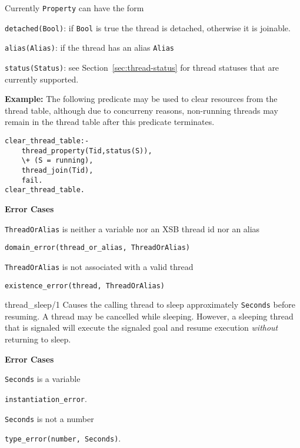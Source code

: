 \begin{description}
Currently {\tt Property} can have the form 
\bi
\item {\tt detached(Bool)}: if {\tt Bool} is true the thread is
  detached, otherwise it is joinable.
%
\item {\tt alias(Alias)}: if the thread has an alias {\tt Alias}
%
\item {\tt status(Status)}: see Section~\ref{sec:thread-status} for
  thread statuses that are currently supported.
\ei

{\bf Example:} The following predicate may be used to clear resources
from the thread table, although due to concurreny reasons, non-running
threads may remain in the thread table after this predicate
terminates.
\begin{verbatim}
clear_thread_table:- 
    thread_property(Tid,status(S)),
    \+ (S = running),
    thread_join(Tid),
    fail.
clear_thread_table.
\end{verbatim}

{\bf Error Cases}
%
\bi
\item {\tt ThreadOrAlias} is neither a variable nor an XSB thread id
  nor an alias
\bi
\item {\tt domain\_error(thread\_or\_alias, ThreadOrAlias)}
\ei
\item {\tt ThreadOrAlias} is not associated with a valid thread
\bi
\item {\tt existence\_error(thread, ThreadOrAlias)}
\ei
\ei

{thread\_sleep/1}
%
Causes the calling thread to sleep approximately {\tt Seconds}
before resuming.  A thread may be cancelled while sleeping.  However,
a sleeping thread that is signaled will execute the signaled goal
and resume execution {\em without} returning to sleep.

{\bf Error Cases}
\bi
\item 	{\tt Seconds} is a variable
\bi
\item 	{\tt instantiation\_error}.
\ei
\item 	{\tt Seconds} is not a number
\bi
\item 	{\tt type\_error(number, Seconds)}.
\ei
\ei



% 
\end{description}

